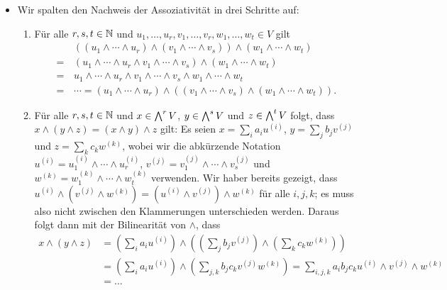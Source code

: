 \begin{itemize}
  \item
    Wir spalten den Nachweis der Assoziativität in drei Schritte auf:
    \begin{enumerate}
      \item
        Für alle $r, s, t \in \mathbb{N}$ und  $u_1, \dotsc, u_r, v_1, \dotsc, v_r, w_1, \dotsc, w_t \in V$ gilt
        \begin{align*}
           &\,  ( (u_1 \wedge \dotsb \wedge u_r) \wedge (v_1 \wedge \dotsb \wedge v_s) ) \wedge (w_1 \wedge \dotsb \wedge w_t)
          \\
          =&\,  ( u_1 \wedge \dotsb \wedge u_r \wedge v_1 \wedge \dotsb \wedge v_s ) \wedge (w_1 \wedge \dotsb \wedge w_t)
          \\
          =&\,  u_1 \wedge \dotsb \wedge u_r \wedge v_1 \wedge \dotsb \wedge v_s \wedge w_1 \wedge \dotsb \wedge w_t
          \\
          =&\,  \dotsb
          =     (u_1 \wedge \dotsb \wedge u_r) \wedge ((v_1 \wedge \dotsb \wedge v_s) \wedge (w_1 \wedge \dotsb \wedge w_t)).
        \end{align*}
      \item
        Für alle $r, s, t \in \mathbb{N}$ und $x \in \bigwedge^{r} V$, $y \in \bigwedge^{s} V$ und $z \in \bigwedge^{t} V$ folgt, dass $x \wedge (y \wedge z) = (x \wedge y) \wedge z$ gilt:
        Es seien $x = \sum_i a_i u^{(i)}$, $y = \sum_j b_j v^{(j)}$ und $z = \sum_k c_k w^{(k)}$, wobei wir die abkürzende Notation $u^{(i)} = u^{(i)}_1 \wedge \dotsb \wedge u^{(i)}_r$, $v^{(j)} = v^{(j)}_1 \wedge \dotsb \wedge v^{(j)}_s$ und $w^{(k)} = w^{(k)}_1 \wedge \dotsb \wedge w^{(k)}_t$ verwenden.
        Wir haber bereits gezeigt, dass $u^{(i)} \wedge (v^{(j)} \wedge w^{(k)}) = (u^{(i)} \wedge v^{(j)}) \wedge w^{(k)}$ für alle $i,j,k$;
        es muss also nicht zwischen den Klammerungen unterschieden werden.
        Daraus folgt dann mit der Bilinearität von $\wedge$, dass
        \begin{align*}
              x \wedge (y \wedge z)
          &=          \left( \sum_i a_i u^{(i)} \right)
              \wedge  \left( \left( \sum_j b_j v^{(j)} \right) \wedge \left( \sum_k c_k w^{(k)} \right) \right)
          \\
          &=  \left( \sum_i a_i u^{(i)} \right) \wedge \left( \sum_{j,k} b_j c_k v^{(j)} w^{(k)} \right)
          =   \sum_{i,j,k} a_i b_j c_k u^{(i)} \wedge v^{(j)} \wedge w^{(k)}
          \\
          &=  \dotso

\end{align*}
\end{enumerate}
\end{itemize}
